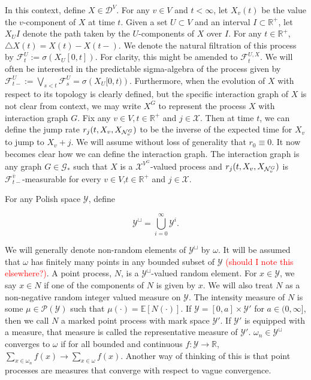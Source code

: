 \documentclass[12pt]{article}
\newcommand{\mb}{\mathbb}
\newcommand{\mc}{\mathcal}
\newcommand{\ra}{\rightarrow}
\newcommand{\ov}{\overline}
\newcommand{\tr}{\textcolor{red}}
\newcommand{\ind}{\hspace{24pt}}
\newcommand{\ex}[1]{\mb{E}\left[#1\right]}			%
\newcommand{\defeq}{:=}								%
\newcommand{\pmsr}{\mc{P}}							%
\newcommand{\cad}{\mc{D}}							%
\newcommand{\sta}{\mc{X}}							%
\newcommand{\gneigh}[2]{\mc{N}^{#1}_{#2}}			%
\newcommand{\cl}[1]{\ov{#1}}						%
\newcommand{\Xf}{X}									%
\newcommand{\poiss}{N}								%
\newcommand{\rate}{r}								%
\newcommand{\F}{\mc{F}}								%
\newcommand{\delt}{\triangle}						%
\newcommand{\dpoiss}{\omega}						%
\newcommand{\vind}[1]{_{#1}}						%
\newcommand{\tme}[1]{(#1)}							%
\newcommand{\tmi}[1]{#1}							%
\newcommand{\gind}[1]{^{#1}}						%
\newcommand{\vpara}[1]{^{#1}}						%
\newcommand{\stpara}[1]{_{#1}}						%
\newcommand{\tpara}[1]{_{#1}}						%
\newcommand{\vpropara}[2]{^{#1,#2}}					%
\newcommand{\Gs}{\mc{G}_\ast}						%
\newcommand{\tmepro}[3]{
\ifstrempty{#3}{
	(#1,#2)}{
	(#1,#2,#3)}}									%
\newcommand{\spce}{\mc{Y}}							%
\renewcommand{\it}[1]{_{#1}}						%
\begin{document}
\ind In this context, define \(\Xf \in \cad\vpara{V}\). For any \(v \in V\) and \(t < \infty\), let \(\Xf\vind{v}\tme{t}\) be the value the \(v\)-component of \(\Xf\) at time \(t\). Given a set \(U\subset V\) and an interval \(I \subset \mb{R}^+\), let \(\Xf\vind{U}\tmi{I}\) denote the path taken by the \(U\)-components of \(\Xf\) over \(\tmi{I}\). For any \(t\in\mb{R}^+\), \(\delt \Xf\tme{t} = \Xf\tme{t} - \Xf\tme{t-}\). We denote the natural filtration of this process by \(\F\vpara{U}\tpara{t} \defeq \sigma \left(\Xf\vind{U}\tmi{[0,t]}\right)\). For clarity, this might be amended to \(\F\vpropara{U}{\Xf}\tpara{t}\). We will often be interested in the predictable sigma-algebra of the process given by \(\F\vpara{U}\tpara{t-} \defeq \bigvee_{s < t} \F\vpara{U}\tpara{s} = \sigma\left(\Xf\vind{U}\tmi{[0,t)}\right)\). Furthermore, when the evolution of \(\Xf\) with respect to its topology is clearly defined, but the specific interaction graph of \(\Xf\) is not clear from context, we may write \(\Xf\gind{G}\) to represent the process \(\Xf\) with interaction graph \(G\). Fix any \(v \in V,t \in \mb{R}^+\) and \(j \in \sta\). Then at time \(t\), we can define the jump rate \(\rate\stpara{j}\tmepro{t}{\Xf\vind{v}}{\Xf\vind{\gneigh{G}{v}}}\) to be the inverse of the expected time for \(\Xf\vind{v}\) to jump to \(\Xf\vind{v} + j\). We will assume without loss of generality that \(\rate\stpara{0}\equiv 0\). It now becomes clear how we can define the interaction graph. The interaction graph is any graph \(G\in \Gs\) such that \(\Xf\) is a \(\sta^{V\gind{G}}\)-valued process and \(\rate\stpara{j}\tmepro{t}{\Xf\vind{v}}{\Xf\vind{\gneigh{G}{v}}}\) is \(\F\vpara{\cl{v}}\tpara{t-}\)-measurable for every \(v \in V\),\(t\in \mb{R}^+\) and \(j \in \sta\). 

\ind For any Polish space \(\spce\), define

\[\spce^\sqcup = \bigcup_{i=0}^\infty \spce^i.\]

We will generally denote non-random elements of \(\spce^\sqcup\) by \(\dpoiss\). It will be assumed that \(\dpoiss\) has finitely many points in any bounded subset of \(\spce\) \tr{(should I note this elsewhere?)}. A point process, \(\poiss\), is a \(\spce^\sqcup\)-valued random element. For \(x \in \spce\), we say \(x \in \poiss\) if one of the components of \(\poiss\) is given by \(x\). We will also treat \(\poiss\) as a non-negative random integer valued measure on \(\spce\). The intensity measure of \(\poiss\) is some \(\mu\in \pmsr(\spce)\) such that \(\mu(\cdot) = \ex{\poiss(\cdot)}\). If \(\spce = [0,a]\times \spce'\) for \(a \in (0,\infty]\), then we call \(\poiss\) a marked point process with mark space \(\spce'\). If \(\spce'\) is equipped with a measure, that measure is called the representative measure of \(\spce'\). \(\dpoiss\it{n} \in \spce^\sqcup\) converges to \(\dpoiss\) if for all bounded and continuous \(f: \spce \ra \mb{R}\), \(\sum_{x \in \dpoiss\it{n}} f(x) \ra \sum_{x \in \dpoiss} f(x)\). Another way of thinking of this is that point processes are measures that converge with respect to vague convergence.
\end{document}

